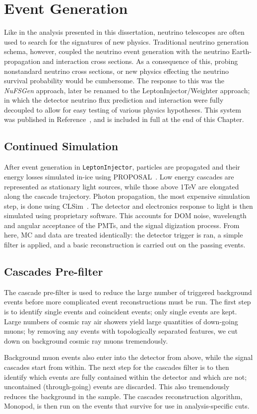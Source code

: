 \documentclass[main.tex]{subfiles}
\begin{document}
\section{Event Generation}

Like in the analysis presented in this dissertation, neutrino telescopes are often used to search for the signatures of new physics. 
Traditional neutrino generation schema, however, coupled the neutrino event generation with the neutrino Earth-propagation and interaction cross sections.
As a consequence of this, probing nonstandard neutrino cross sections, or new physics effecting the neutrino survival probability would be cumbersome. 
The response to this was the \textit{NuFSGen} approach, later be renamed to the LeptonInjector/Weighter approach; in which the detector neutrino flux prediction and interaction were fully decoupled to allow for easy testing of various physics hypotheses. 
This system was published in Reference~\cite{ABBASI2021108018}, and is included in full at the end of this Chapter.

\subsection{Continued Simulation}

After event generation in \texttt{LeptonInjector}, particles are propagated and their energy losses simulated in-ice using PROPOSAL~\cite{Koehne:2013gpa}.
Low energy cascades are represented as stationary light sources, while those above 1TeV are elongated along the cascade trajectory. 
Photon propagation, the most expensive simulation step, is done using CLSim~\cite{CLSim}. 
The detector and electronics response to light is then simulated using proprietary software. 
This accounts for DOM noise, wavelength and angular acceptance of the PMTs, and the signal digization process.
From here, MC and data are treated identically: the detector trigger is ran, a simple filter is applied, and a basic reconstruction is carried out on the passing events. 

\subsection{Cascades Pre-filter}\label{sec:level3}

The cascade pre-filter is used to reduce the large number of triggered background events before more complicated event reconstructions must be run. 
The first step is to identify single events and coincident events; only single events are kept. 
Large numbers of cosmic ray air showers yield large quantities of down-going muons; by removing any events with topologically separated features, we cut down on background cosmic ray muons tremendously. 

Background muon events also enter into the detector from above, while the signal cascades start from within.
The next step for the cascades filter is to then identify which events are fully contained within the detector and which are not; uncontained (through-going) events are discarded. 
This also tremendously reduces the background in the sample. 
The cascades reconstruction algorithm, Monopod, is then run on the events that survive for use in analysis-specific cuts.
\end{document}
